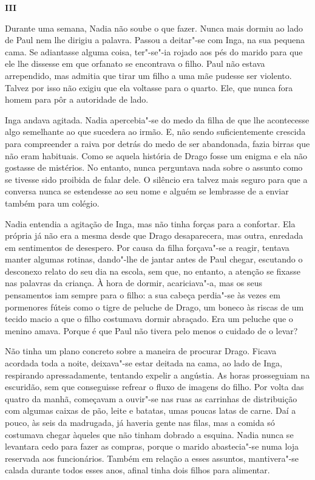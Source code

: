 \pagebreak
\thispagestyle{empty}
\movetooddpage
\vspace*{1.8cm}
\noindent{}\textbf{III}

\bigskip

Durante uma semana, Nadia não soube o que fazer. Nunca mais dormiu ao
lado de Paul nem lhe dirigiu a palavra. Passou a deitar"-se com Inga, na
sua pequena cama. Se adiantasse alguma coisa, ter"-se"-ia rojado aos pés
do marido para que ele lhe dissesse em que orfanato se encontrava o
filho. Paul não estava arrependido, mas admitia que tirar um filho a uma
mãe pudesse ser violento. Talvez por isso não exigiu que ela voltasse
para o quarto. Ele, que nunca fora homem para pôr a autoridade de lado.

Inga andava agitada. Nadia apercebia"-se do medo da filha de que lhe
acontecesse algo semelhante ao que sucedera ao irmão. E, não sendo
suficientemente crescida para compreender a raiva por detrás do medo de
ser abandonada, fazia birras que não eram habituais. Como se aquela
história de Drago fosse um enigma e ela não gostasse de mistérios. No
entanto, nunca perguntava nada sobre o assunto como se tivesse sido
proibida de falar dele. O silêncio era talvez mais seguro para que a
conversa nunca se estendesse ao seu nome e alguém se lembrasse de a
enviar também para um colégio.

Nadia entendia a agitação de Inga, mas não tinha forças para a
confortar. Ela própria já não era a mesma desde que Drago desaparecera,
mas outra, enredada em sentimentos de desespero. Por causa da filha
forçava"-se a reagir, tentava manter algumas rotinas, dando"-lhe de jantar
antes de Paul chegar, escutando o desconexo relato do seu dia na escola,
sem que, no entanto, a atenção se fixasse nas palavras da criança. À
hora de dormir, acariciava"-a, mas os seus pensamentos iam sempre para
o filho: a sua cabeça perdia"-se às vezes em pormenores fúteis como o
tigre de peluche de Drago, um boneco às riscas de um tecido macio a que
o filho costumava dormir abraçado. Era um peluche que o menino amava.
Porque é que Paul não tivera pelo menos o cuidado de o levar?

Não tinha um plano concreto sobre a maneira de procurar Drago. Ficava acordada toda a noite, deixava"-se estar deitada na
cama, ao lado de Inga, respirando apressadamente, tentando expelir a
angústia. As horas prosseguiam na escuridão, sem que conseguisse
refrear o fluxo de imagens do filho. Por volta das quatro da manhã,
começavam a ouvir"-se nas ruas as carrinhas de distribuição com algumas
caixas de pão, leite e batatas, umas poucas latas de carne. Daí a pouco,
às seis da madrugada, já haveria gente nas filas, mas a comida só
costumava chegar àqueles que não tinham dobrado a esquina. Nadia nunca
se levantara cedo para fazer as compras, porque o marido abastecia"-se
numa loja reservada aos funcionários. Também em relação a esses
assuntos, mantivera"-se calada durante todos esses anos, afinal tinha
dois filhos para alimentar.

